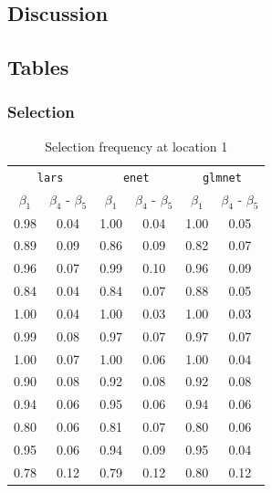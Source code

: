 \documentclass[authoryear, review, 11pt]{elsarticle}
\begin{document}
		
	\subsection{Discussion}
	
	
	
	\subsection{Tables}
		\subsubsection{Selection}
		\begin{table}[ht]
		\begin{center}
		\begin{tabular}{cc|cc|cc}
		\multicolumn{2}{c}{\texttt{lars}} & \multicolumn{2}{c}{\texttt{enet}} & \multicolumn{2}{c}{\texttt{glmnet}} \\
		 $\beta_1$ & $\beta_4$ - $\beta_5$ & $\beta_1$ & $\beta_4$ - $\beta_5$ & $\beta_1$ & $\beta_4$ - $\beta_5$ \\ 
		  \hline
		0.98 & 0.04 & 1.00 & 0.04 & 1.00 & 0.05 \\ 
		  0.89 & 0.09 & 0.86 & 0.09 & 0.82 & 0.07 \\ 
		  0.96 & 0.07 & 0.99 & 0.10 & 0.96 & 0.09 \\ 
		  0.84 & 0.04 & 0.84 & 0.07 & 0.88 & 0.05 \\ 
		  \hline
		  1.00 & 0.04 & 1.00 & 0.03 & 1.00 & 0.03 \\ 
		  0.99 & 0.08 & 0.97 & 0.07 & 0.97 & 0.07 \\ 
		  1.00 & 0.07 & 1.00 & 0.06 & 1.00 & 0.04 \\ 
		  0.90 & 0.08 & 0.92 & 0.08 & 0.92 & 0.08 \\ 
		  \hline
		  0.94 & 0.06 & 0.95 & 0.06 & 0.94 & 0.06 \\ 
		  0.80 & 0.06 & 0.81 & 0.07 & 0.80 & 0.06 \\ 
		  0.95 & 0.06 & 0.94 & 0.09 & 0.95 & 0.04 \\ 
		  0.78 & 0.12 & 0.79 & 0.12 & 0.80 & 0.12 \\ 
		  \end{tabular}
		\caption{Selection frequency at location 1\label{table:loc1-selection}}
		\end{center}
		\end{table}
\end{document}
